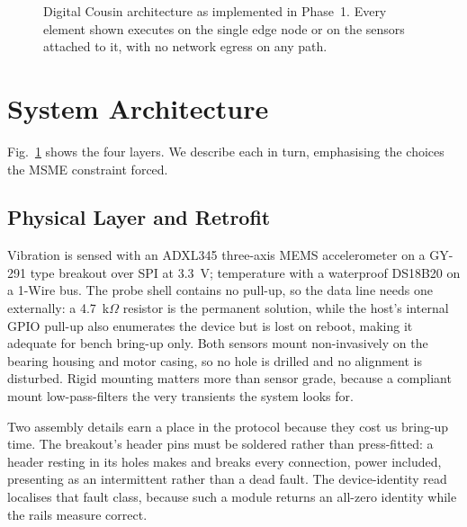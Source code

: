 \documentclass[conference]{IEEEtran}
\begin{document}
\begin{figure}[t]
\caption{Digital Cousin architecture as implemented in Phase~1. Every
element shown executes on the single edge node or on the sensors attached to
it, with no network egress on any path.}
\label{fig:arch}
\end{figure}

\section{System Architecture}
\label{sec:arch}

Fig.~\ref{fig:arch} shows the four layers. We describe each in turn,
emphasising the choices the MSME constraint forced.

\subsection{Physical Layer and Retrofit}

Vibration is sensed with an ADXL345 three-axis MEMS accelerometer on a
GY-291 type breakout over SPI at 3.3~V; temperature with a waterproof
DS18B20 on a 1-Wire bus. The probe shell contains no pull-up, so the data
line needs one externally: a 4.7~k$\Omega$ resistor is the permanent
solution, while the host's internal GPIO pull-up also enumerates the device
but is lost on reboot, making it adequate for bench bring-up only. Both
sensors mount non-invasively on the bearing housing and motor casing, so no
hole is drilled and no alignment is disturbed. Rigid mounting matters more
than sensor grade, because a compliant mount low-pass-filters the very
transients the system looks for.

Two assembly details earn a place in the protocol because they cost us
bring-up time. The breakout's header pins must be soldered rather than
press-fitted: a header resting in its holes makes and breaks every
connection, power included, presenting as an intermittent rather than a dead
fault. The device-identity read localises that fault class, because such a
module returns an all-zero identity while the rails measure correct.
\end{document}
